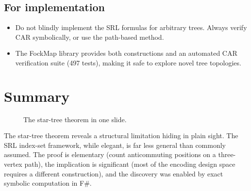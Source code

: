 \documentclass[11pt,a4paper]{article}
\theoremstyle{definition}
\begin{document}
\subsection{For implementation}

\begin{itemize}
  \item Do not blindly implement the SRL formulas for arbitrary trees.
    Always verify CAR symbolically, or use the path-based method.

  \item The FockMap library provides both constructions and an
    automated CAR verification suite (497 tests), making it safe
    to explore novel tree topologies.
\end{itemize}

\section{Summary}
\label{sec:summary}

\begin{figure}[h]
\centering
{}
\caption{The star-tree theorem in one slide.}
\label{fig:one-slide}
\end{figure}

The star-tree theorem reveals a structural limitation hiding in plain
sight.  The SRL index-set framework, while elegant, is far less general
than commonly assumed.  The proof is elementary (count anticommuting
positions on a three-vertex path), the implication is significant
(most of the encoding design space requires a different construction),
and the discovery was enabled by exact symbolic computation in F\#.
\end{document}
